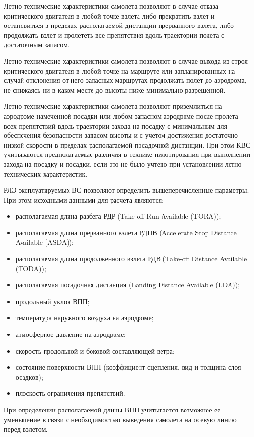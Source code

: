 Летно-технические характеристики самолета позволяют в случае отказа критического двигателя в любой точке взлета либо прекратить взлет и остановиться в пределах располагаемой дистанции прерванного взлета, либо продолжать взлет и пролететь все препятствия вдоль траектории полета с достаточным запасом. 
 
Летно-технические характеристики самолета позволяют в случае выхода из строя критического двигателя в любой точке на маршруте или запланированных на случай отклонения от него запасных маршрутах продолжать полет до аэродрома, не снижаясь ни в каком месте до высоты ниже минимально разрешенной. 

Летно-технические характеристики самолета позволяют приземлиться на аэродроме намеченной посадки или любом запасном аэродроме после пролета всех препятствий вдоль траектории захода на посадку с минимальным для обеспечения безопасности запасом высоты и с учетом достижения достаточно низкой скорости в пределах располагаемой посадочной дистанции. При этом КВС учитываются предполагаемые различия в технике пилотирования при выполнении захода на посадку и посадки, если это не было учтено при установлении летно-технических характеристик.

РЛЭ эксплуатируемых ВС позволяют определить вышеперечисленные параметры. При этом исходными данными для расчета являются:
\begin{itemize} 
    \item располагаемая длина разбега РДР (Take-off Run Available (TORA));
    \item располагаемая длина прерванного взлета РДПВ (Accelerate Stop Distance Available (ASDA));
    \item располагаемая длина продолженного взлета РДВ (Take-off Distance Available (TODA));
    \item располагаемая посадочная дистанция (Landing Distance Available (LDA));
    \item продольный уклон ВПП;
    \item температура наружного воздуха на аэродроме;
    \item атмосферное давление на аэродроме;
    \item скорость продольной и боковой составляющей ветра;
    \item состояние поверхности ВПП (коэффициент сцепления, вид и толщина слоя осадков);
    \item плоскость ограничения препятствий.
\end{itemize}
При определении располагаемой длины ВПП учитывается возможное ее уменьшение в связи с необходимостью выведения самолета на осевую линию перед взлетом.


